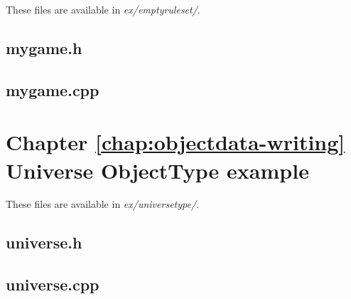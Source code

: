 \documentclass[a4paper,11pt]{report}
\newcommand{\filename}[1]{\emph{#1}}
\begin{document}
These files are available in \filename{ex/emptyruleset/}.

\section{mygame.h}


\section{mygame.cpp}




\chapter{Chapter \ref{chap:objectdata-writing} Universe ObjectType example}
\label{apx:universe_ex}

These files are available in \filename{ex/universetype/}.

\section{universe.h}


\section{universe.cpp}

\end{document}
